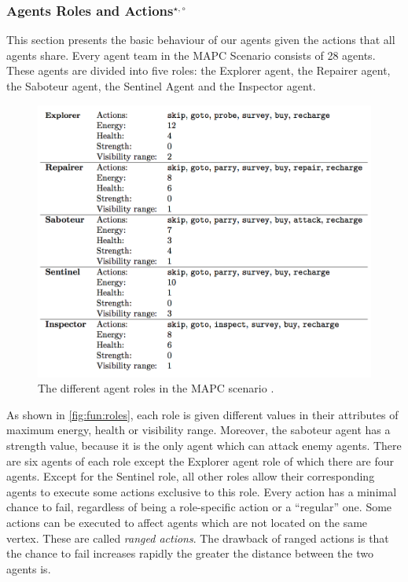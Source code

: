 \subsubsection[Agent Roles and Actions]{Agents Roles and Actions$^{\star,\circ}$}\label{fun:mapc_roles}
This section presents the basic behaviour of our agents given the actions that all agents share.
Every agent team in the MAPC Scenario consists of 28 agents.
These agents are divided into five roles: the Explorer agent, the Repairer agent, the Saboteur agent, the Sentinel Agent and the Inspector agent.
\begin{figure}[ht]
  \centering
  \includegraphics[width=0.9\linewidth]{images/roles.png}
  \caption{The different agent roles in the MAPC scenario \cite{ahlbrecht_mapc_2014}.}
  \label{fig:fun:roles}
\end{figure}
As shown in \autoref{fig:fun:roles}, each role is given different values in their attributes of maximum energy, health or visibility range.
Moreover, the saboteur agent has a strength value, because it is the only agent which can attack enemy agents.
There are six agents of each role except the Explorer agent role of which there are four agents.
Except for the Sentinel role, all other roles allow their corresponding agents to execute some actions exclusive to this role.
Every action has a minimal chance to fail, regardless of being a role-specific action or a \enquote{regular} one.
Some actions can be executed to affect agents which are not located on the same vertex.
These are called \emph{ranged actions}.
The drawback of ranged actions is that the chance to fail increases rapidly the greater the distance between the two agents is.

